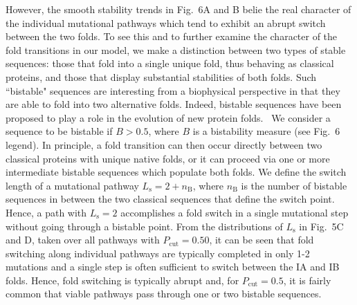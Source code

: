\documentclass[
aip,
rsi,%
amsmath,amssymb,
reprint,%
]{revtex4-1}
\newcommand {\Pcut}     	{{P_\mathrm{cut}}}
\begin{document}
However, the smooth stability trends in Fig.~6A and B belie the real character of the individual mutational pathways which tend to exhibit an abrupt switch between the two folds. To see this and to further examine the character of the fold transitions in our model, we make a distinction between two types of stable sequences: those that fold into a single unique fold, thus behaving as classical proteins, and those that display substantial stabilities of both folds. Such ``bistable" sequences are interesting from a biophysical perspective in that they are able to fold into two alternative folds. Indeed, bistable sequences have been proposed to play a role in the evolution of new protein folds.~\cite{Sikosek2012} We consider a sequence to be bistable if $B>0.5$, where $B$ is a bistability measure (see Fig.~6 legend). In principle, a fold transition can then occur directly between two classical proteins with unique native folds, or it can proceed via one or more intermediate bistable sequences which populate both folds. We define the switch length of a mutational pathway $L_\mathrm{s}=2+n_\mathrm{B}$, where $n_\mathrm{B}$ is the number of bistable sequences in between the two classical sequences that define the switch point. Hence, a path with $L_\mathrm{s}=2$ accomplishes a fold switch in a single mutational step without going through a bistable point. From the distributions of  $L_\mathrm{s}$ in Fig.~5C and D, taken over all pathways with $\Pcut=0.50$, it can be seen that fold switching along individual pathways are typically completed in only 1-2 mutations and a single step is often sufficient to switch between the IA and IB folds. Hence, fold switching is typically abrupt and, for $\Pcut = 0.5$, it is fairly common that viable pathways pass through one or two bistable sequences. 
\end{document}
